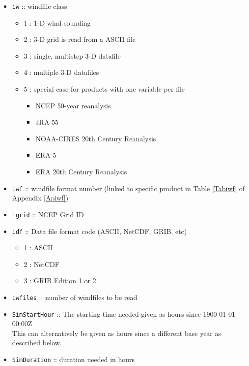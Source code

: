 \documentclass[11pt]{article}   %
\begin{document}
\begin{itemize}
\item \texttt{iw} :: windfile class 
 \begin{itemize}
 \item 1 : 1-D wind sounding
 \item 2 : 3-D grid is read from a ASCII file
 \item 3 : single, multistep 3-D datafile
 \item 4 : multiple 3-D datafiles
 \item 5 : special case for products with one variable per file
   \begin{itemize}
     \item NCEP 50-year reanalysis
     \item JRA-55
     \item NOAA-CIRES 20th Century Reanalysis
     \item ERA-5
     \item ERA 20th Century Reanalysis
   \end{itemize}
 \end{itemize}
\item \texttt{iwf} :: windfile format number (linked to specific product in Table
  \ref{Tabiwf} of Appendix \ref{Apiwf})
\item \texttt{igrid} :: NCEP Grid ID
\item \texttt{idf} :: Data file format code (ASCII, NetCDF, GRIB, etc)
 \begin{itemize}
 \item   1 : ASCII
 \item   2 : NetCDF
 \item   3 : GRIB Edition 1 or 2
 \end{itemize}
\item \texttt{iwfiles} :: number of windfiles to be read
\item \texttt{SimStartHour} ::  The starting time needed given as hours since 1900-01-01 00:00Z\\
This can alternatively be given as hours since a different base year as described below.
\item \texttt{SimDuration} ::  duration needed in hours
\end{itemize}
\end{document}
